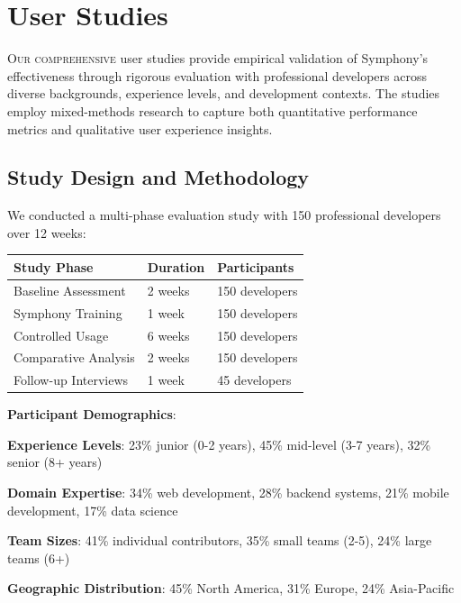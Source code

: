 
\section*{User Studies}

\lettrine{O}{ur comprehensive} user studies provide empirical validation of Symphony's effectiveness through rigorous evaluation with professional developers across diverse backgrounds, experience levels, and development contexts. The studies employ mixed-methods research to capture both quantitative performance metrics and qualitative user experience insights.

\subsection*{Study Design and Methodology}

We conducted a multi-phase evaluation study with 150 professional developers over 12 weeks:

\begin{center}
\begin{tabular}{@{}lll@{}}
\toprule
\textbf{Study Phase} & \textbf{Duration} & \textbf{Participants} \\
\midrule
Baseline Assessment & 2 weeks & 150 developers \\
Symphony Training & 1 week & 150 developers \\
Controlled Usage & 6 weeks & 150 developers \\
Comparative Analysis & 2 weeks & 150 developers \\
Follow-up Interviews & 1 week & 45 developers \\
\bottomrule
\end{tabular}
\end{center}

\textbf{Participant Demographics}:
\begin{expandedlist}
    \item \textbf{Experience Levels}: 23\% junior (0-2 years), 45\% mid-level (3-7 years), 32\% senior (8+ years)
    \item \textbf{Domain Expertise}: 34\% web development, 28\% backend systems, 21\% mobile development, 17\% data science
    \item \textbf{Team Sizes}: 41\% individual contributors, 35\% small teams (2-5), 24\% large teams (6+)
    \item \textbf{Geographic Distribution}: 45\% North America, 31\% Europe, 24\% Asia-Pacific
\end{expandedlist}

